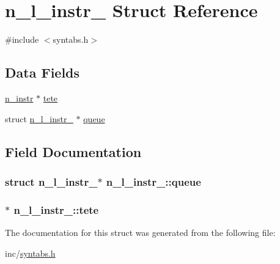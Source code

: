 \hypertarget{structn__l__instr__}{}\section{n\+\_\+l\+\_\+instr\+\_\+ Struct Reference}
\label{structn__l__instr__}


{\ttfamily \#include $<$syntabs.\+h$>$}

\subsection*{Data Fields}
\begin{DoxyCompactItemize}
\item 
\hyperlink{syntabs_8h_a23ea3d0367a10d34c91c5349a8a9433c}{n\+\_\+instr} $\ast$ \hyperlink{structn__l__instr___a7fdea23352ed9ac78701b3180b83bbf3}{tete}
\item 
struct \hyperlink{structn__l__instr__}{n\+\_\+l\+\_\+instr\+\_\+} $\ast$ \hyperlink{structn__l__instr___a61f735335e01371c60b83e57dd0e7aed}{queue}
\end{DoxyCompactItemize}


\subsection{Field Documentation}
\subsubsection[{\texorpdfstring{queue}{queue}}]{\setlength{\rightskip}{0pt plus 5cm}struct {\bf n\+\_\+l\+\_\+instr\+\_\+}$\ast$ n\+\_\+l\+\_\+instr\+\_\+\+::queue}\hypertarget{structn__l__instr___a61f735335e01371c60b83e57dd0e7aed}{}\label{structn__l__instr___a61f735335e01371c60b83e57dd0e7aed}
\subsubsection[{\texorpdfstring{tete}{tete}}]{$\ast$ n\+\_\+l\+\_\+instr\+\_\+\+::tete}\hypertarget{structn__l__instr___a7fdea23352ed9ac78701b3180b83bbf3}{}\label{structn__l__instr___a7fdea23352ed9ac78701b3180b83bbf3}


The documentation for this struct was generated from the following file\+:\begin{DoxyCompactItemize}
\item 
inc/\hyperlink{syntabs_8h}{syntabs.\+h}\end{DoxyCompactItemize}
